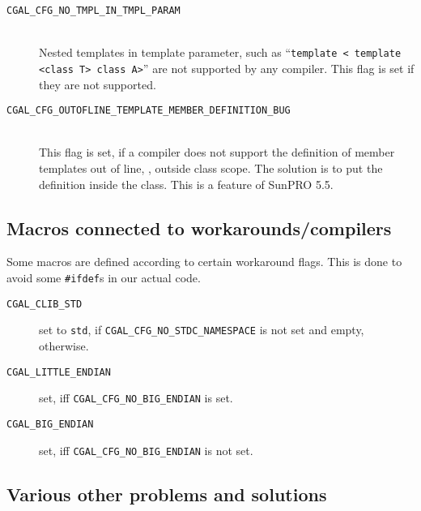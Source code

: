 \begin{description}
\item[{\tt CGAL\_CFG\_NO\_TMPL\_IN\_TMPL\_PARAM}]~\\
  Nested templates in template parameter, such as ``\texttt{template <
    template <class T> class A>}'' are not supported by any compiler.
  This flag is set if they are not supported.

\item[{\tt CGAL\_CFG\_OUTOFLINE\_TEMPLATE\_MEMBER\_DEFINITION\_BUG}]~\\
  This flag is set, if a compiler does not support the definition of
  member templates out of line, \ie, outside class scope. The solution
  is to put the definition inside the class. This is a feature of
  SunPRO 5.5.

\end{description}

\subsection{Macros connected to workarounds/compilers}
\label{sec:workaround_macros}

Some macros are defined according to certain workaround flags. This is
done to avoid some \texttt{\#ifdef}s in our actual code.

\begin{description}
\item[\texttt{CGAL\_CLIB\_STD}] 
  set to \texttt{std}, if
  {\texttt{CGAL\_CFG\_NO\_STDC\_NAMESPACE}} is not set and
  empty, otherwise.
\item[\texttt{CGAL\_LITTLE\_ENDIAN}] set, iff
  {\texttt{CGAL\_CFG\_NO\_BIG\_ENDIAN}} is set.
\item[\texttt{CGAL\_BIG\_ENDIAN}] set, iff
  {\texttt{CGAL\_CFG\_NO\_BIG\_ENDIAN}} is not set.
\end{description}


\subsection{Various other problems and solutions}
\label{sec:various_problems}

